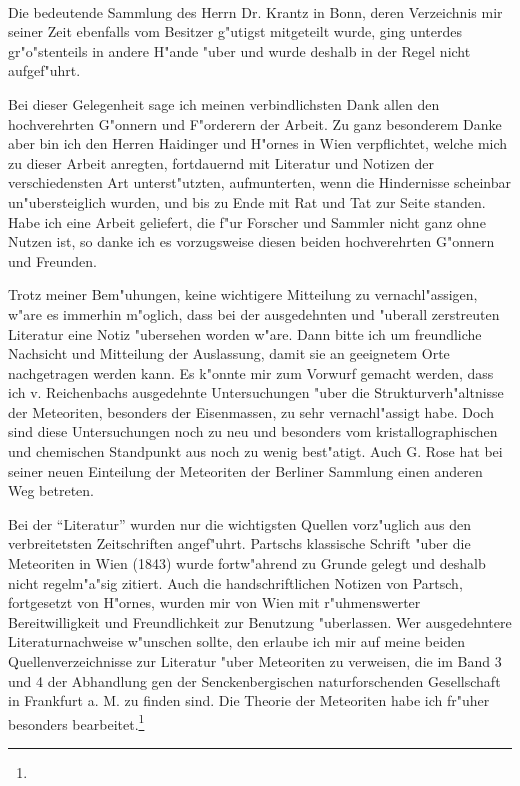 \documentclass[a4paper, 11pt, oneside]{article}
\begin{document}
\paragraph{}
Die bedeutende Sammlung des Herrn Dr. Krantz in Bonn, deren Verzeichnis mir seiner Zeit ebenfalls vom Besitzer g"utigst mitgeteilt wurde, ging unterdes gr"o"stenteils in andere H"ande "uber und wurde deshalb in der Regel nicht aufgef"uhrt.

Bei dieser Gelegenheit sage ich meinen verbindlichsten Dank allen den hochverehrten G"onnern und F"orderern der Arbeit. Zu ganz besonderem Danke aber bin ich den Herren Haidinger und H"ornes in Wien verpflichtet, welche mich zu dieser Arbeit anregten, fortdauernd mit Literatur und Notizen der verschiedensten Art unterst"utzten, aufmunterten, wenn die Hindernisse scheinbar un"ubersteiglich wurden, und bis zu Ende mit Rat und Tat zur Seite standen. Habe ich eine Arbeit geliefert, die f"ur Forscher und Sammler nicht ganz ohne Nutzen ist, so danke ich es vorzugsweise diesen beiden hochverehrten G"onnern und Freunden.

Trotz meiner Bem"uhungen, keine wichtigere Mitteilung zu vernachl"assigen, w"are es immerhin m"oglich, dass bei der ausgedehnten und "uberall zerstreuten Literatur eine Notiz "ubersehen worden w"are. Dann bitte ich um freundliche Nachsicht und Mitteilung der Auslassung, damit sie an geeignetem Orte nachgetragen werden kann. Es k"onnte mir zum Vorwurf gemacht werden, dass ich v. Reichenbachs ausgedehnte Untersuchungen "uber die Strukturverh"altnisse der Meteoriten, besonders der Eisenmassen, zu sehr vernachl"assigt habe. Doch sind diese Untersuchungen noch zu neu und besonders vom kristallographischen und chemischen Standpunkt aus noch zu wenig best"atigt. Auch G. Rose hat bei seiner neuen Einteilung der Meteoriten der Berliner Sammlung einen anderen Weg betreten.

Bei der "`Literatur"' wurden nur die wichtigsten Quellen vorz"uglich aus den verbreitetsten Zeitschriften angef"uhrt. Partschs klassische Schrift "uber die Meteoriten in Wien (1843) wurde fortw"ahrend zu Grunde gelegt und deshalb nicht regelm"a"sig zitiert. Auch die handschriftlichen Notizen von Partsch, fortgesetzt von H"ornes, wurden mir von Wien mit r"uhmenswerter Bereitwilligkeit und Freundlichkeit zur Benutzung "uberlassen. Wer ausgedehntere Literaturnachweise w"unschen sollte, den erlaube ich mir auf meine beiden Quellenverzeichnisse zur Literatur "uber Meteoriten zu verweisen, die im Band 3 und 4 der Abhandlung gen der Senckenbergischen naturforschenden Gesellschaft in Frankfurt a. M. zu finden sind. Die Theorie der Meteoriten habe ich fr"uher besonders bearbeitet.\footnote{}
\end{document}
